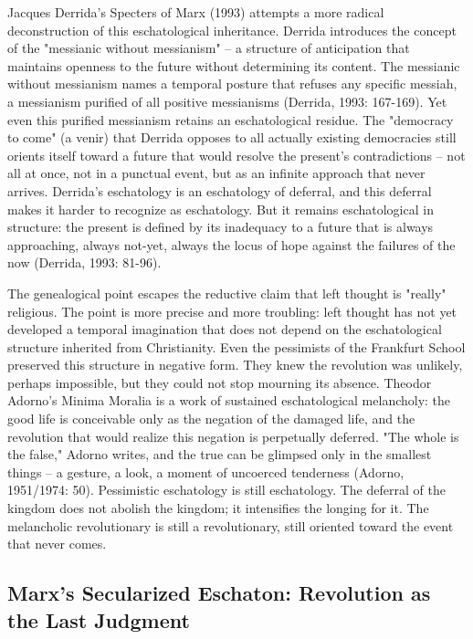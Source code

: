 Jacques Derrida's Specters of Marx (1993) attempts a more radical deconstruction of this eschatological inheritance. Derrida introduces the concept of the "messianic without messianism" -- a structure of anticipation that maintains openness to the future without determining its content. The messianic without messianism names a temporal posture that refuses any specific messiah, a messianism purified of all positive messianisms (Derrida, 1993: 167-169). Yet even this purified messianism retains an eschatological residue. The "democracy to come" (a venir) that Derrida opposes to all actually existing democracies still orients itself toward a future that would resolve the present's contradictions -- not all at once, not in a punctual event, but as an infinite approach that never arrives. Derrida's eschatology is an eschatology of deferral, and this deferral makes it harder to recognize as eschatology. But it remains eschatological in structure: the present is defined by its inadequacy to a future that is always approaching, always not-yet, always the locus of hope against the failures of the now (Derrida, 1993: 81-96).

The genealogical point escapes the reductive claim that left thought is "really" religious. The point is more precise and more troubling: left thought has not yet developed a temporal imagination that does not depend on the eschatological structure inherited from Christianity. Even the pessimists of the Frankfurt School preserved this structure in negative form. They knew the revolution was unlikely, perhaps impossible, but they could not stop mourning its absence. Theodor Adorno's Minima Moralia is a work of sustained eschatological melancholy: the good life is conceivable only as the negation of the damaged life, and the revolution that would realize this negation is perpetually deferred. "The whole is the false," Adorno writes, and the true can be glimpsed only in the smallest things -- a gesture, a look, a moment of uncoerced tenderness (Adorno, 1951/1974: 50). Pessimistic eschatology is still eschatology. The deferral of the kingdom does not abolish the kingdom; it intensifies the longing for it. The melancholic revolutionary is still a revolutionary, still oriented toward the event that never comes.

\subsection{Marx's Secularized Eschaton: Revolution as the Last Judgment}

